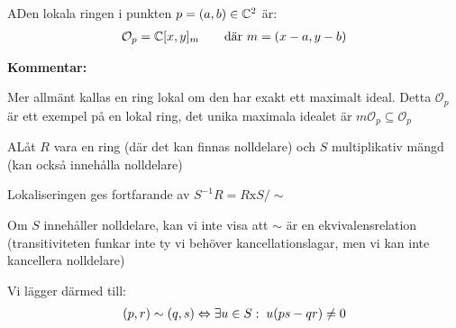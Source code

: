 \par\bigskip
\begin{theo}
  ADen lokala ringen i punkten $p=(a,b)\in\mathbb{C}^2$ är:
  \begin{equation*}
    \begin{gathered}
      \mathcal{O}_p =\mathbb{C}[x,y]_m\qquad \text{där }m=(x-a,y-b)
    \end{gathered}
  \end{equation*}
\end{theo}
\par\bigskip
\noindent\textbf{Kommentar:}\par
\noindent Mer allmänt kallas en ring lokal om den har exakt ett maximalt ideal. Detta $\mathcal{O}_p$ är ett exempel på en lokal ring, det unika maximala idealet är $m\mathcal{O}_p\subseteq\mathcal{O}_p$
\par\bigskip
\begin{theo}
  ALåt $R$ vara en ring (där det kan finnas nolldelare) och $S$ multiplikativ mängd (kan också innehålla nolldelare)
  \par\bigskip
  \noindent Lokaliseringen ges fortfarande av $S^{-1}R = R\text{x}S/\sim$
  \par\bigskip
  \noindent Om $S$ innehåller nolldelare, kan vi inte visa att $\sim$ är en ekvivalensrelation (transitiviteten funkar inte ty vi behöver kancellationslagar, men vi kan inte kancellera nolldelare)
  \par\bigskip
  \noindent Vi lägger därmed till:
  \begin{equation*}
    \begin{gathered}
      (p,r)\sim(q,s)\Leftrightarrow\exists u\in S:\; u(ps-qr)\neq0
    \end{gathered}
  \end{equation*}
\end{theo}
